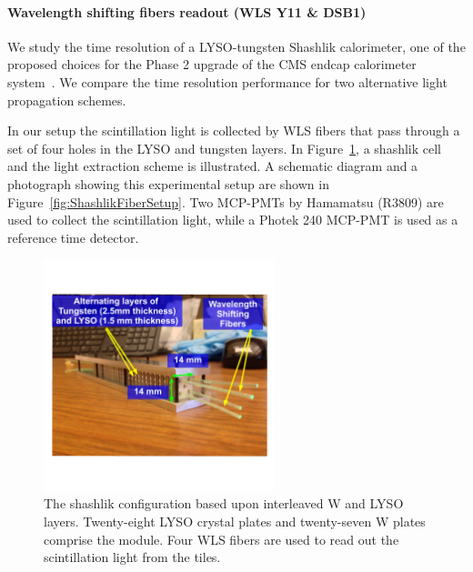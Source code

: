 \paragraph{Wavelength shifting fibers readout (WLS Y11 \& DSB1)}
We study the time resolution of a LYSO-tungsten Shashlik calorimeter, one of the
proposed choices for the Phase 2 upgrade of the CMS endcap calorimeter
system~\cite{Contardo:1605208}. We compare the time resolution performance for
two alternative light propagation schemes. 

In our setup the scintillation light is collected by WLS fibers that
pass through a set of four holes in the LYSO and tungsten layers. In 
Figure~\ref{fig:ShashlikDiagram}, a shashlik cell and the light extraction 
scheme is illustrated. A schematic diagram and a photograph showing this experimental
setup are shown in Figure~\ref{fig:ShashlikFiberSetup}. Two MCP-PMTs  by 
Hamamatsu (R3809) are used to collect the scintillation light, while a Photek 240 
MCP-PMT is used as a reference time detector. 

\begin{figure}[ht!] \centering
\includegraphics[width=0.6\textwidth]{figs/ShashlikCellPhoto.pdf} 
\caption{\small The shashlik configuration based upon interleaved W and LYSO layers. 
Twenty-eight LYSO crystal plates and twenty-seven W plates comprise the module.
Four WLS fibers are used to read out the scintillation light from the 
tiles. } 
\label{fig:ShashlikDiagram}
\end{figure}

